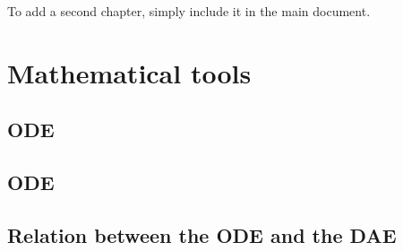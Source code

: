 To add a second chapter, simply include it in the main document.

\section{Mathematical tools}
\subsection{ODE}
\subsection{ODE}
\subsection{Relation between the ODE and the DAE}
